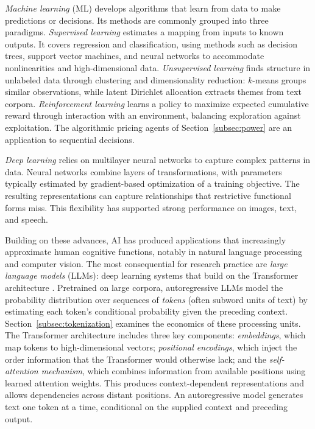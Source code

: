 \documentclass[12pt]{article}
\theoremstyle{plain}
\theoremstyle{definition}
\theoremstyle{remark}
\begin{document}
\emph{Machine learning} (ML) develops algorithms that learn from
data to make predictions or decisions. Its methods are commonly grouped
into three paradigms. \emph{Supervised learning} estimates a mapping
from inputs to known outputs. It covers regression and classification,
using methods such as decision trees, support vector machines, and
neural networks to accommodate nonlinearities and high-dimensional
data. \emph{Unsupervised learning} finds structure in unlabeled data
through clustering and dimensionality reduction: $k$-means groups
similar observations, while latent Dirichlet allocation extracts themes
from text corpora. \emph{Reinforcement learning}
learns a policy to maximize expected cumulative reward through
interaction with an environment, balancing exploration against
exploitation. The algorithmic pricing agents of
Section~\ref{subsec:power} are an application to sequential decisions.

\emph{Deep learning} relies on multilayer neural networks to capture
complex patterns in data. Neural networks combine layers of transformations, with parameters
typically estimated by gradient-based optimization of a training
objective. The resulting representations can capture relationships
that restrictive functional forms miss. This flexibility has supported
strong performance on images, text, and speech.

Building on these advances, AI has produced applications that increasingly
approximate human cognitive functions, notably in natural language
processing and computer vision. The most consequential for research
practice are \emph{large language models} (LLMs): deep learning systems
that build on the Transformer architecture \citep{Vaswani2017}.
Pretrained on large corpora, autoregressive LLMs model the probability
distribution over sequences of \emph{tokens} (often subword units
of text) by estimating each token's conditional
probability given the preceding context. Section~\ref{subsec:tokenization}
examines the economics of these processing units. The Transformer architecture includes
three key components: \emph{embeddings}, which map tokens to
high-dimensional vectors; \emph{positional encodings}, which inject the order
information that the Transformer would otherwise lack; and the
\emph{self-attention mechanism}, which combines information from
available positions using learned attention weights. This produces
context-dependent representations and allows dependencies across
distant positions. An autoregressive model generates text one token at
a time, conditional on the supplied context and preceding output.
\end{document}
